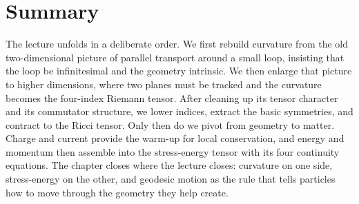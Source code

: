 \section{Summary}

The lecture unfolds in a deliberate order. We first rebuild curvature from the old two-dimensional picture of parallel transport around a small loop, insisting that the loop be infinitesimal and the geometry intrinsic. We then enlarge that picture to higher dimensions, where two planes must be tracked and the curvature becomes the four-index Riemann tensor. After cleaning up its tensor character and its commutator structure, we lower indices, extract the basic symmetries, and contract to the Ricci tensor. Only then do we pivot from geometry to matter. Charge and current provide the warm-up for local conservation, and energy and momentum then assemble into the stress-energy tensor with its four continuity equations. The chapter closes where the lecture closes: curvature on one side, stress-energy on the other, and geodesic motion as the rule that tells particles how to move through the geometry they help create.